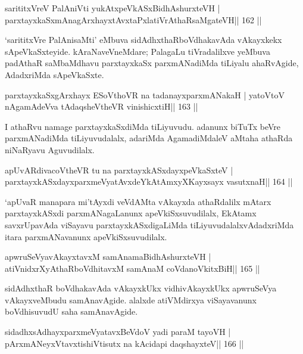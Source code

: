 \begin{shl}
sarititxVreV PalAniVti yukAtx\s peVkASx\s BidhAshurxteVH |
parxtayxkaSxmAnagArxhayxtAvxtaPxlatiVrAthaRsaMgateVH\hfill || 162 ||
\end{shl}

\begin{artha}
`sarititxVre PalAnisaMti' eMbuva sidAdhxthaRboVdhakavAda vAkayxkekx sApeVkaSxteyide. kAraNaveVneMdare; PalagaLu tiVradalilxve yeMbuva padAthaR saMbaMdhavu parxtayxkaSx parxmANadiMda tiLiyalu ahaRvAgide, AdadxriMda sApeVkaSxte.
\end{artha}

\begin{shl}
parxtayxkaSxgArxhayx ESoV\s thoVR na tadanayxparxmANakaH |
yatoV\s toV nA\s\s gamAdeVva tAdaqsheV\s theVR vinishicxtiH\hfill || 163 ||
\end{shl}

\begin{artha}
I athaRvu namage parxtayxkaSxdiMda tiLiyuvudu. adanunx biTuTx beVre parxmANadiMda tiLiyuvudalalx, adariMda AgamadiMdaleV aMtaha athaRda niNaRyavu Aguvudilalx.
\end{artha}

\begin{shl}
apUvARdivacoV\s theVR tu na parxtayxkASxdayxpeVkaSxteV |
parxtayxkASxdayxparxmeVyatAvxdeYkAtAmxyXKayxsayx vasutxnaH\hfill || 164 ||
\end{shl}

\begin{artha}
`apUvaR manapara mi'tAyxdi veVdAMta vAkayxda athaRdalilx mAtarx parxtayxkASxdi parxmANagaLanunx apeVkiSxsuvudilalx, EkAtamx savxrUpavAda viSayavu parxtayxkASxdigaLiMda tiLiyuvudalalxvAdadxriMda itara parxmANavanunx apeVkiSxsuvudilalx.
\end{artha}

\begin{shl}
apwruSeVyavAkayxtavxM samAnamaBidhAshurxteVH |
atiVnidxrXyAthaRboVdhitavxM samAnaM coVdanoVkitxBiH\hfill || 165 ||
\end{shl}

\begin{artha}
sidAdhxthaR boVdhakavAda vAkayxkUkx vidhivAkayxkUkx apwruSeVya vAkayxveMbudu samAnavAgide. alalxde atiVMdirxya viSayavanunx boVdhisuvudU saha samAnavAgide.
\end{artha}

\begin{shl}
sidadhxsAdhayxparxmeVyatavxBeVdoV yadi paraM tayoVH |
pArxmANeyxVtavxtishiVtisutx na kAcidapi daqshayxteV\hfill || 166 ||
\end{shl}

